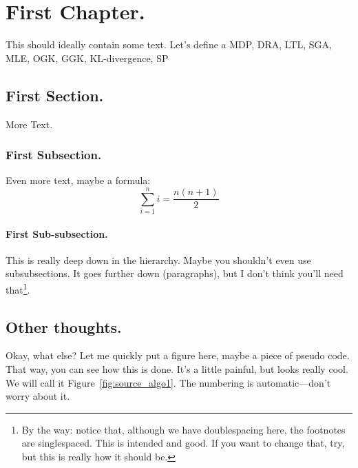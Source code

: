 %
%
\chapter{First Chapter.}
This should ideally contain some text. Let's define a \ac{MDP}, \ac{DRA}, \ac{LTL}, \ac{SGA}, \ac{MLE}, \ac{OGK}, \ac{GGK}, \ac{KL}-divergence, \ac{SP}
\section{First Section.}
More Text.
\subsection[Alternative title for the Table of Contents]{First Subsection.}
Even more text, maybe a formula:
\begin{equation}
\sum_{i=1}^{n}i=\frac{n(n+1)}{2} %
\end{equation}
\subsubsection{First Sub-subsection.}
This is really deep down in the hierarchy. Maybe you shouldn't even
use sub\-subsections. It goes further down (paragraphs), but I don't
think you'll need that\footnote{By the way: notice that, although we
have doublespacing here, the footnotes are singlespaced. This is
intended and good. If you want to change that, try, but this is really
how it should be.}.

\section{Other thoughts.}
Okay, what else?
Let me quickly put a figure here, maybe a piece of pseudo code.
That way, you can see how this is done. It's a little painful, but
looks really cool. We will call it Figure~\ref{fig:source_algo1}. The
numbering is automatic---don't worry about it.

